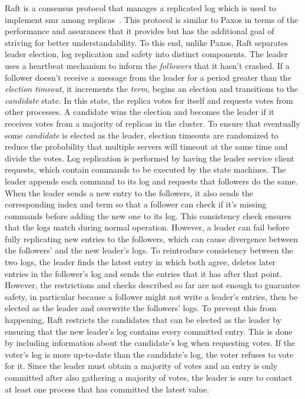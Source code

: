 Raft is a consensus protocol that manages a replicated log which is used to implement \acrshort{smr} among replicas~\cite{184040}. This protocol is similar to Paxos in terms of the performance and assurances that it provides but has the additional goal of striving for better understandability. To this end, unlike Paxos, Raft separates leader election, log replication and safety into distinct components. The leader uses a heartbeat mechanism to inform the \textit{followers} that it hasn't crashed. If a follower doesn't receive a message from the leader for a period greater than the \textit{election timeout}, it increments the \textit{term}, begins an election and transitions to the \textit{candidate} state. In this state, the replica votes for itself and requests votes from other processes. A candidate wins the election and becomes the leader if it receives votes from a majority of replicas in the cluster. To ensure that eventually some \textit{candidate} is elected as the leader, election timeouts are randomized to reduce the probability that multiple servers will timeout at the same time and divide the votes. Log replication is performed by having the leader service client requests, which contain commands to be executed by the state machines. The leader appends each command to its log and requests that followers do the same. When the leader sends a new entry to the followers, it also sends the corresponding index and term so that a follower can check if it's missing commands before adding the new one to its log. This consistency check ensures that the logs match during normal operation. However, a leader can fail before fully replicating new entries to the followers, which can cause divergence between the followers' and the new leader's logs. To reintroduce consistency between the two logs, the leader finds the latest entry in which both agree, deletes later entries in the follower's log and sends the entries that it has after that point. However, the restrictions and checks described so far are not enough to guarantee safety, in particular because a follower might not write a leader's entries, then be elected as the leader and overwrite the followers' logs. To prevent this from happening, Raft restricts the candidates that can be elected as the leader by ensuring that the new leader's log contains every committed entry. This is done by including information about the candidate's log when requesting votes. If the voter's log is more up-to-date than the candidate's log, the voter refuses to vote for it. Since the leader must obtain a majority of votes and an entry is only committed after also gathering a majority of votes, the leader is sure to contact at least one process that has committed the latest value. \par
